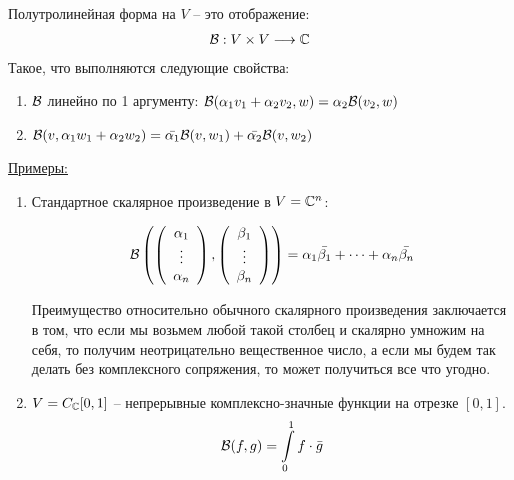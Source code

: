 \begin{conj}
    Полутролинейная форма на $V$ -- это отображение: 
    \begin{gather*}
        \mathcal{B}: V \times V \longrightarrow \mathbb{C}
    \end{gather*}
    Такое, что выполняются следующие свойства: 
    \begin{enumerate}
        \item $\mathcal{B}$ линейно по 1 аргументу: $\mathcal{B}(\alpha_1 v_1 + \alpha_2 v_2, w) = \alpha_2 \mathcal{B}(v_2, w)$
        \item $\mathcal{B}(v, \alpha_1 w_1 + \alpha_2 w_2) = \bar{\alpha_1} \mathcal{B}(v, w_1) + \bar{\alpha_2}\mathcal{B}(v, w_2)$
    \end{enumerate}
    \underline{Примеры:}
    \begin{enumerate}
        \item Стандартное скалярное произведение в $V = \mathbb{C}^n$:
        
        \begin{gather*}
            \mathcal{B}\left(\left(\begin{array}{c}
            \alpha_1 \\ 
            \vdots \\ 
            \alpha_n
            \end{array}\right), 
            \left(\begin{array}{c}
            \beta_1 \\ 
            \vdots \\ 
            \beta_n
            \end{array}\right)\right) 
            = \alpha_1 \bar{\beta_1} + \dots + \alpha_n \bar{\beta_n}
        \end{gather*}

        Преимущество относительно обычного скалярного произведения заключается в том, что если мы возьмем любой такой столбец и
        скалярно умножим на себя, то получим неотрицательно вещественное число, а если мы будем так делать без комплексного 
        сопряжения, то может получиться все что угодно.

        \item $V = C_{\mathbb{C}} [0, 1]$ -- непрерывные комплексно-значные функции на отрезке $[0, 1]$.
        \begin{gather*}
            \mathcal{B}(f, g) = \int\limits_0^1 f \cdot \bar{g}
        \end{gather*}
    \end{enumerate}    
\end{conj}

